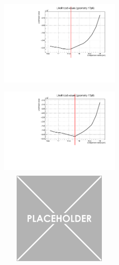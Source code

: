 \documentclass[a4paper, 11pt]{report}
\begin{document}
\begin{figure}[htbp]
\begin{minipage}[b]{.32\textwidth}
\includegraphics[width=6cm, height=4.6cm]{figs/likelihood250LowStat/likelihood17p6.pdf}
\end{minipage}\hfill
\begin{minipage}[b]{.32\textwidth}
\includegraphics[width=6cm, height=4.6cm]{figs/likelihood250LowStat/likelihood17p8.pdf}
\end{minipage} \hfill
\begin{minipage}[b]{.32\textwidth}
\includegraphics[width=6cm, height=4.6cm]{figs/placeholder.png}
\end{minipage} \hfill \vspace{10pt}


\end{figure}
\end{document}
